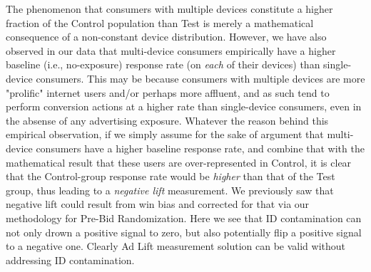 \documentclass[11pt,a4paper]{article}
\theoremstyle{definition}
\theoremstyle{remark}
\theoremstyle{definition}
\theoremstyle{definition}
\theoremstyle{definition}
\theoremstyle{definition}
\theoremstyle{definition}
\theoremstyle{definition}
\begin{document}
The phenomenon that consumers with multiple devices constitute a higher fraction of the Control population than Test is merely a mathematical consequence of a non-constant device distribution. However, we have also observed in our data that multi-device consumers empirically have a higher baseline (i.e., no-exposure) response rate (on \textit{each} of their devices) than single-device consumers. This may be because consumers with multiple devices are more "prolific" internet users and/or perhaps more affluent, and as such tend to perform conversion actions at a higher rate than single-device consumers, even in the absense of any advertising exposure. Whatever the reason behind this empirical observation, if we simply assume for the sake of argument that multi-device consumers have a higher baseline response rate, and combine that with the mathematical result that these users are over-represented in Control, it is clear that the Control-group response rate would be \textit{higher} than that of the Test group, thus leading to a \textit{negative lift} measurement. We previously saw that negative lift could result from win bias and corrected for that via our methodology for Pre-Bid Randomization. Here we see that ID contamination can not only drown a positive signal to zero, but also potentially flip a positive signal to a negative one. Clearly Ad Lift measurement solution can be valid without addressing ID contamination.
\end{document}
